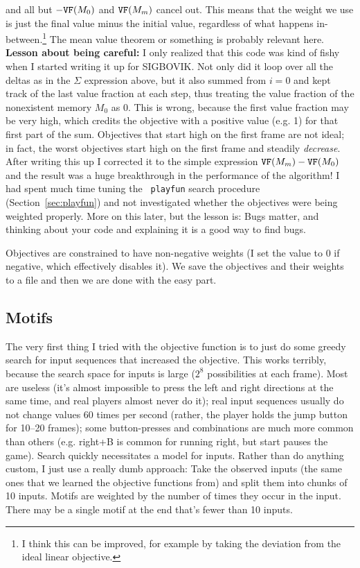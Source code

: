 \documentclass[twocolumn]{article}
\begin{document}
%
and all but $-{\tt VF}(M_0)$ and ${\tt VF}(M_m)$ cancel out. This
means that the weight we use is just the final value minus the initial
value, regardless of what happens in-between.\footnote{I think this
  can be improved, for example by taking the deviation from the ideal
  linear objective.} The mean value theorem or something is probably
relevant here. {\bf Lesson about being careful:} I only realized that
this code was kind of fishy when I started writing it up for SIGBOVIK.
Not only did it loop over all the deltas as in the $\Sigma$ expression
above, but it also summed from $i=0$ and kept track of the last value
fraction at each step, thus treating the value fraction of the
nonexistent memory $M_0$ as 0. This is wrong, because the first value
fraction may be very high, which credits the objective with a positive
value (e.g. 1) for that first part of the sum. Objectives that start
high on the first frame are not ideal; in fact, the worst objectives
start high on the first frame and steadily {\em decrease}. After
writing this up I corrected it to the simple expression ${\tt VF}(M_m)
- {\tt VF}(M_0)$ and the result was a huge breakthrough in the
performance of the algorithm! I had spent much time tuning the {\tt
  playfun} search procedure (Section~\ref{sec:playfun}) and not
investigated whether the objectives were being weighted properly. More
on this later, but the lesson is: Bugs matter, and thinking about your
code and explaining it is a good way to find bugs.

Objectives are constrained to have non-negative weights (I set the
value to 0 if negative, which effectively disables it). We save the
objectives and their weights to a file and then we are done with the
easy part.

\subsection{Motifs} \label{sec:motifs}

The very first thing I tried with the objective function is to just do
some greedy search for input sequences that increased the objective.
This works terribly, because the search space for inputs is large
($2^8$ possibilities at each frame). Most are useless (it's almost
impossible to press the left and right directions at the same time,
and real players almost never do it); real input sequences usually do
not change values 60 times per second (rather, the player holds the
jump button for 10--20 frames); some button-presses and combinations
are much more common than others (e.g. right+B is common for running
right, but start pauses the game). Search quickly necessitates a model
for inputs. Rather than do anything custom, I just use a really dumb
approach: Take the observed inputs (the same ones that we learned the
objective functions from) and split them into chunks of 10 inputs.
Motifs are weighted by the number of times they occur in the input.
There may be a single motif at the end that's fewer than 10 inputs.
\end{document}
